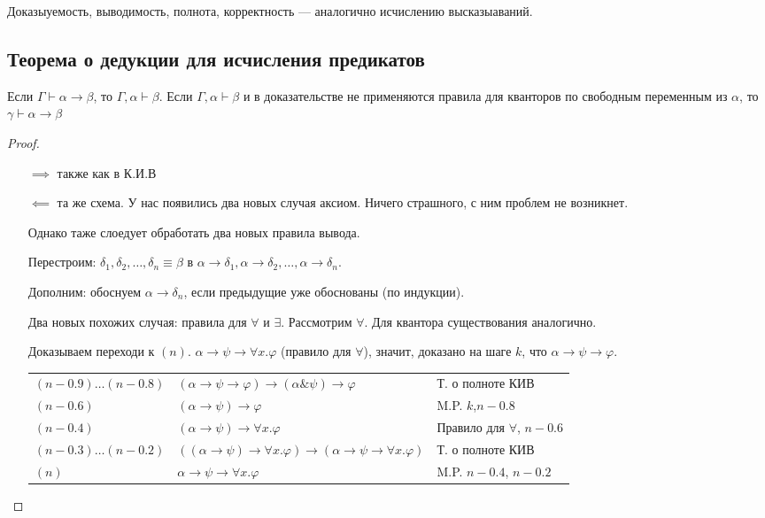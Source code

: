 \begin{statement}
    Доказыуемость, выводимость, полнота, корректность --- аналогично исчислению высказыаваний.
\end{statement}


\subsection{Теорема о дедукции для исчисления предикатов}
\begin{theorem}
    Если    $\Gamma \vdash \alpha \to \beta$, то $\Gamma, \alpha \vdash \beta$.
    Если $\Gamma, \alpha\vdash \beta$ и в доказательстве не применяются правила для кванторов по свободным переменным из $\alpha$, то $\gamma\vdash \alpha \to \beta$
\end{theorem}
\begin{proof}
    \begin{itemize}
        \item []
        \item [$\implies $] также как в К.И.В
        \item [$\impliedby $] та же схема. У нас появились два новых случая аксиом. Ничего страшного, с ним проблем не возникнет.

Однако таже слоедует обработать два новых правила вывода.

Перестроим: $\delta_1, \delta_2, \dots, \delta_n \equiv \beta$ в $\alpha\rightarrow\delta_1, \alpha\rightarrow\delta_2, \dots, \alpha\rightarrow\delta_n$.

Дополним: обоснуем $\alpha\rightarrow\delta_n$, если предыдущие уже обоснованы (по индукции).

Два новых похожих случая: правила для $\forall$ и $\exists$. Рассмотрим $\forall$. Для квантора существования аналогично.

Доказываем переходи к $(n)$. $\alpha\rightarrow\psi\rightarrow\forall x.\varphi$ (правило для $\forall$), значит, доказано
на шаге $k$, что $\alpha\rightarrow\psi\rightarrow\varphi$.

\begin{tabular}{lll}
$(n-0.9) \dots (n-0.8)$ &
$(\alpha\rightarrow\psi\rightarrow\varphi)\rightarrow(\alpha\&\psi)\rightarrow\varphi$ &
Т. о полноте КИВ\\
$(n-0.6)$ & $(\alpha\to\psi)\rightarrow\varphi$ & M.P. $k$,$n-0.8$\\
$(n-0.4)$ & $(\alpha\to\psi)\rightarrow\forall x.\varphi$ & Правило для $\forall$, $n-0.6$\\
$(n-0.3) \dots (n-0.2)$ & $((\alpha\to\psi)\rightarrow\forall x.\varphi)\rightarrow(\alpha\rightarrow\psi\rightarrow\forall x.\varphi)$ & Т. о полноте КИВ\\
$(n)$ & $\alpha\rightarrow\psi\rightarrow\forall x.\varphi$ & M.P. $n-0.4$, $n-0.2$
\end{tabular}
    \end{itemize}
\end{proof}

